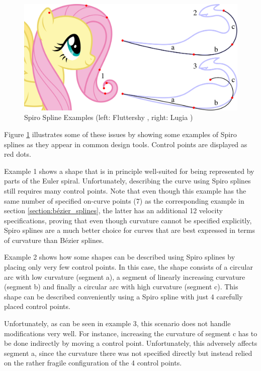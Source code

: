 \documentclass[a4paper]{article}
\begin{document}
				\begin{figure}[htbp]
					\centering
					\includegraphics[width=\textwidth]{../resources/examples_spiro.pdf}
					\caption{Spiro Spline Examples (left: Fluttershy \cite{fluttershy}, right: Lugia \cite{lugia})}
					\label{figure:examples_spiro}
				\end{figure}

				Figure \ref{figure:examples_spiro} illustrates some of these issues by showing some examples of Spiro splines as they appear in common design tools. Control points are displayed as red dots.

				Example 1 shows a shape that is in principle well-suited for being represented by parts of the Euler spiral. Unfortunately, describing the curve using Spiro splines still requires many control points. Note that even though this example has the same number of specified on-curve points (7) as the corresponding example in section \ref{section:bézier_splines}, the latter has an additional 12 velocity specifications, proving that even though curvature cannot be specified explicitly, Spiro splines are a much better choice for curves that are best expressed in terms of curvature than Bézier splines.

				Example 2 shows how some shapes can be described using Spiro splines by placing only very few control points. In this case, the shape consists of a circular arc with low curvature (segment a), a segment of linearly increasing curvature (segment b) and finally a circular arc with high curvature (segment c). This shape can be described conveniently using a Spiro spline with just 4 carefully placed control points.

				Unfortunately, as can be seen in example 3, this scenario does not handle modifications very well. For instance, increasing the curvature of segment c has to be done indirectly by moving a control point. Unfortunately, this adversely affects segment a, since the curvature there was not specified directly but instead relied on the rather fragile configuration of the 4 control points.
\end{document}
